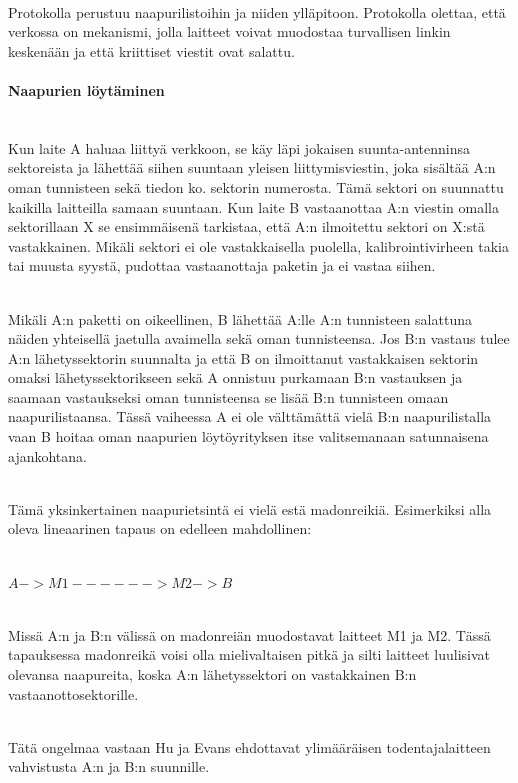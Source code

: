 \documentclass[finnish]{tktltiki2}
\theoremstyle{definition}
\theoremstyle{remark}
\begin{document}
\noindent \\
Protokolla perustuu naapurilistoihin ja niiden ylläpitoon. Protokolla olettaa, että verkossa on mekanismi, jolla laitteet voivat muodostaa turvallisen linkin keskenään ja että kriittiset viestit ovat salattu.

\paragraph{Naapurien löytäminen}
\noindent\\
Kun laite A haluaa liittyä verkkoon, se käy läpi jokaisen suunta-antenninsa sektoreista ja lähettää siihen suuntaan yleisen liittymisviestin, joka sisältää A:n oman tunnisteen sekä tiedon ko. sektorin numerosta. Tämä sektori on suunnattu kaikilla laitteilla samaan suuntaan. Kun laite B vastaanottaa A:n viestin omalla sektorillaan X se ensimmäisenä tarkistaa, että A:n ilmoitettu sektori on X:stä vastakkainen. Mikäli sektori ei ole vastakkaisella puolella, kalibrointivirheen takia tai muusta syystä, pudottaa vastaanottaja paketin ja ei vastaa siihen.

\noindent\\
Mikäli A:n paketti on oikeellinen, B lähettää A:lle A:n tunnisteen salattuna näiden yhteisellä jaetulla avaimella sekä oman tunnisteensa. Jos B:n vastaus tulee A:n lähetyssektorin suunnalta ja että B on ilmoittanut vastakkaisen sektorin omaksi lähetyssektorikseen sekä A onnistuu purkamaan B:n vastauksen ja saamaan vastaukseksi oman tunnisteensa se lisää B:n tunnisteen omaan naapurilistaansa. Tässä vaiheessa A ei ole välttämättä vielä B:n naapurilistalla vaan B hoitaa oman naapurien löytöyrityksen itse valitsemanaan satunnaisena ajankohtana.

\noindent\\
Tämä yksinkertainen naapurietsintä ei vielä estä madonreikiä. Esimerkiksi alla oleva lineaarinen tapaus on edelleen mahdollinen:

\noindent\\
$A -> M1 ------> M2 -> B$

\noindent\\
Missä A:n ja B:n välissä on madonreiän muodostavat laitteet M1 ja M2. Tässä tapauksessa madonreikä voisi olla mielivaltaisen pitkä ja silti laitteet luulisivat olevansa naapureita, koska A:n lähetyssektori on vastakkainen B:n vastaanottosektorille. 

\noindent\\
Tätä ongelmaa vastaan Hu ja Evans ehdottavat ylimääräisen todentajalaitteen vahvistusta A:n ja B:n suunnille.
\end{document}
